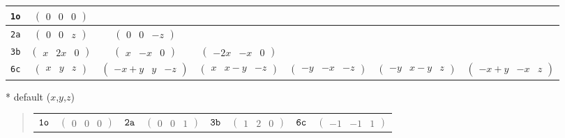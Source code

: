 \documentclass[fleqn,9pt,landscape]{jsarticle}
\begin{document}
\begin{center}
\begin{longtable}{ccccccc}
{\tt 1o} & $ \begin{pmatrix} 0 & 0 & 0 \end{pmatrix} $ & $  $ & $  $ & $  $ & $  $ & $  $ \\ \hline
{\tt 2a} & $ \begin{pmatrix} 0 & 0 & z \end{pmatrix} $ & $ \begin{pmatrix} 0 & 0 & - z \end{pmatrix} $ & $  $ & $  $ & $  $ & $  $ \\ \hline
{\tt 3b} & $ \begin{pmatrix} x & 2 x & 0 \end{pmatrix} $ & $ \begin{pmatrix} x & - x & 0 \end{pmatrix} $ & $ \begin{pmatrix} - 2 x & - x & 0 \end{pmatrix} $ & $  $ & $  $ & $  $ \\ \hline
{\tt 6c} & $ \begin{pmatrix} x & y & z \end{pmatrix} $ & $ \begin{pmatrix} - x + y & y & - z \end{pmatrix} $ & $ \begin{pmatrix} x & x - y & - z \end{pmatrix} $ & $ \begin{pmatrix} - y & - x & - z \end{pmatrix} $ & $ \begin{pmatrix} - y & x - y & z \end{pmatrix} $ & $ \begin{pmatrix} - x + y & - x & z \end{pmatrix} $ \\
\end{longtable}
\end{center}
* default ($x$,$y$,$z$)
\begin{quote}
\begin{tabular}{cccccccc}
$ {\tt 1o} $ & $ \begin{pmatrix} 0 & 0 & 0 \end{pmatrix} $ & $ {\tt 2a} $ & $ \begin{pmatrix} 0 & 0 & 1 \end{pmatrix} $ & $ {\tt 3b} $ & $ \begin{pmatrix} 1 & 2 & 0 \end{pmatrix} $ & $ {\tt 6c} $ & $ \begin{pmatrix} -1 & -1 & 1 \end{pmatrix} $
\end{tabular}
\end{quote}
\end{document}
